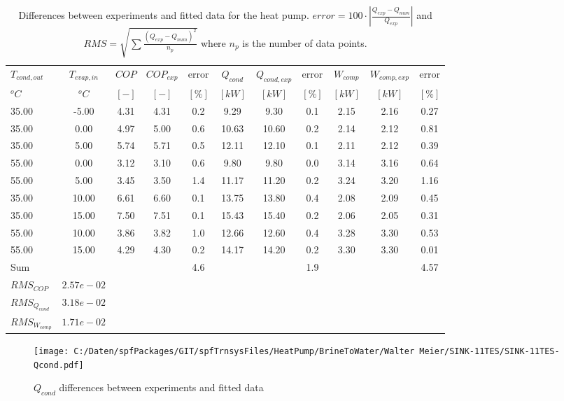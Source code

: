 \documentclass[english]{SPFShortReport}
\begin{document}
\begin{table}[!ht]
\begin{small}
\caption{Differences between experiments and fitted data for the heat pump.          $error=100 \cdot |\frac{Q_{exp}-Q_{num}}{Q_{exp}}|$ and $RMS = \sqrt { \sum{\frac{(Q_{exp}-Q_{num})^2}{n_p}} }$ where $n_p$ is the number of data points.}
\begin{center}
\resizebox{12cm}{!} 
{
\begin{tabular}{l | c c c c c c c c c c } 
\hline
\hline
$T_{cond,out}$ &$T_{evap,in}$ &$COP$ &$COP_{exp}$ &error &$Q_{cond}$ &$Q_{cond,exp}$ &error &$W_{comp}$ &$W_{comp,exp}$ &error \\ 
$^oC$ &$^oC$ &$[-]$ &$[-]$ &$[\%]$ &$[kW]$ &$[kW]$ &$[\%]$ &$[kW]$ &$[kW]$ &$[\%]$\\ 
\hline
35.00  & -5.00 & 4.31 & 4.31 & 0.2 & 9.29 & 9.30 & 0.1 & 2.15 & 2.16 & 0.27\\ 
35.00  & 0.00 & 4.97 & 5.00 & 0.6 & 10.63 & 10.60 & 0.2 & 2.14 & 2.12 & 0.81\\ 
35.00  & 5.00 & 5.74 & 5.71 & 0.5 & 12.11 & 12.10 & 0.1 & 2.11 & 2.12 & 0.39\\ 
55.00  & 0.00 & 3.12 & 3.10 & 0.6 & 9.80 & 9.80 & 0.0 & 3.14 & 3.16 & 0.64\\ 
55.00  & 5.00 & 3.45 & 3.50 & 1.4 & 11.17 & 11.20 & 0.2 & 3.24 & 3.20 & 1.16\\ 
35.00  & 10.00 & 6.61 & 6.60 & 0.1 & 13.75 & 13.80 & 0.4 & 2.08 & 2.09 & 0.45\\ 
35.00  & 15.00 & 7.50 & 7.51 & 0.1 & 15.43 & 15.40 & 0.2 & 2.06 & 2.05 & 0.31\\ 
55.00  & 10.00 & 3.86 & 3.82 & 1.0 & 12.66 & 12.60 & 0.4 & 3.28 & 3.30 & 0.53\\ 
55.00  & 15.00 & 4.29 & 4.30 & 0.2 & 14.17 & 14.20 & 0.2 & 3.30 & 3.30 & 0.01\\ 
\hline 
 Sum &  & &  & 4.6 &  &  & 1.9 & &  & 4.57\\ 
\hline 
 $RMS_{COP}$ & $2.57e-02$ \\ 
 $RMS_{Q_{cond}}$ & $3.18e-02$ \\ 
 $RMS_{W_{comp}}$ & $1.71e-02$ \\ 
\hline
\hline
\end{tabular}
}
\label{ErrorsTable}
\end{center}
\end{small}
\end{table}
\begin{figure}[!ht]
\begin{center}
\texttt{[image: C:/Daten/spfPackages/GIT/spfTrnsysFiles/HeatPump/BrineToWater/Walter Meier/SINK-11TES/SINK-11TES-Qcond.pdf]}
\caption{$Q_{cond}$ differences between experiments and fitted data}
\label{QcongFig}
\end{center}
\end{figure}
\end{document}
